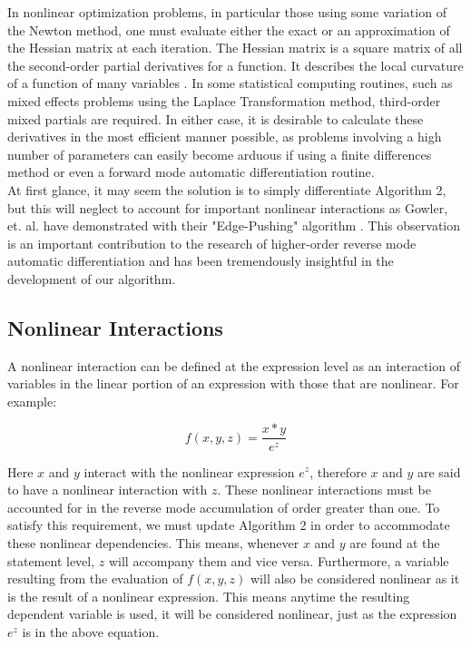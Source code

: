 \documentclass[oneside]{article}
\begin{document}
In nonlinear optimization problems, in particular those using some variation of the Newton method, one must evaluate either the exact or an approximation of the Hessian matrix at each iteration. The Hessian matrix is a square matrix of all the second-order partial derivatives for a function. It describes the local curvature of a function of many variables \cite{wiki_hessian}. In some statistical computing routines, such as mixed effects problems using the Laplace Transformation method, third-order mixed partials are required. In either case, it is desirable to calculate these derivatives in the most efficient manner possible, as problems involving a high number of parameters can easily become arduous if using a finite differences method or even a forward mode automatic differentiation routine. \\
At first glance, it may seem the solution is to simply differentiate Algorithm 2, but this will neglect to account for important nonlinear interactions as Gowler, et. al. have demonstrated with their "Edge-Pushing" algorithm \cite{gowler_ep}.  This observation is an important contribution to the research of higher-order reverse mode automatic differentiation and has been tremendously insightful in the development of our algorithm. 



\subsection{Nonlinear Interactions}
A nonlinear interaction can be defined at the expression level as an interaction of variables in the linear portion of an expression with those that are nonlinear.  For example:

\begin{equation}
 f(x,y,z) = \frac{x*y}{e^z}
\end{equation}

Here $x$ and $y$ interact with the nonlinear expression $e^{z}$, therefore $x$ and $y$ are said to have a nonlinear interaction with $z$. These nonlinear interactions must be accounted for in the reverse mode accumulation of order greater than one. To satisfy this requirement, we must update Algorithm 2 in order to accommodate these nonlinear dependencies. This means, whenever $x$ and $y$ are found at the statement level, $z$ will accompany them and vice versa. Furthermore, a variable resulting from the evaluation of $f(x,y,z)$ will also be considered nonlinear as it is the result of a nonlinear expression. This means anytime the resulting dependent variable is used, it will be considered nonlinear, just as the expression $e^{z}$  is in the above equation.  
\end{document}
